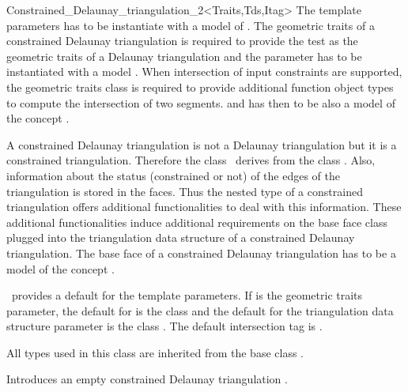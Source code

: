 \begin{ccRefClass}{Constrained_Delaunay_triangulation_2<Traits,Tds,Itag>}
The template parameters  
has to be instantiate with a model of .
The geometric traits 
of a constrained Delaunay triangulation is required
to provide the  test as the geometric traits
of a Delaunay triangulation and the 
parameter has 
to be instantiated with a model
.
When intersection of input constraints are supported, 
the geometric traits class 
is required to provide additional function object  types
to compute the intersection of two segments.
and  has then to be also a model of the concept
.

A constrained Delaunay triangulation is not a Delaunay
triangulation but it is a constrained triangulation.
Therefore the class \ccRefName\ derives from
the class .
Also, information about the status (constrained or not)
of the edges of the triangulation is stored
in the faces. 
Thus the nested 
type of a constrained triangulation offers
additional functionalities to deal with this information.
These additional functionalities 
induce additional requirements on the base face class
plugged into the triangulation data structure of 
 a constrained Delaunay triangulation.
The base face of a constrained Delaunay triangulation
has to be a model of the concept
.

\cgal\ provides a default for the template parameters.
If  is the geometric traits
parameter,
the default  for
  is the class
and the default for the
triangulation data structure parameter is the class
.
The default intersection tag is .


\ccInheritsFrom {}

\ccTypes
All types used in this class are inherited from the base class
.



\ccCreation
{}  %

{Introduces an empty constrained Delaunay triangulation \ccVar.}


\end{ccRefClass}
